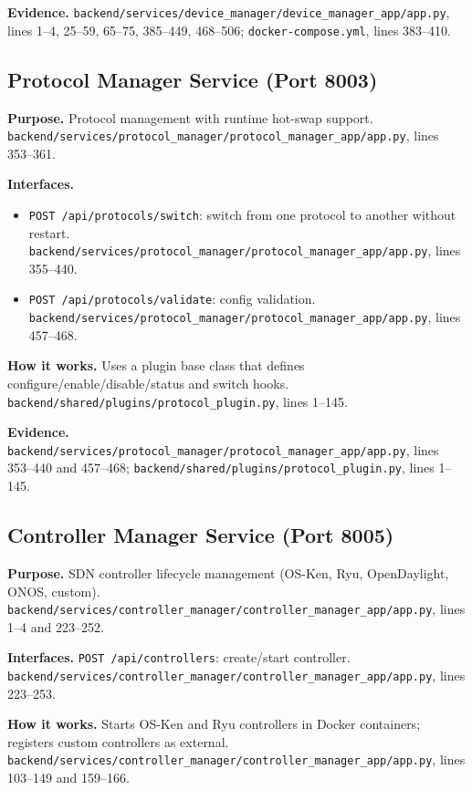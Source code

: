 \documentclass[10pt,a4paper]{article}
\begin{document}
\textbf{Evidence.} \texttt{backend/services/device\_manager/device\_manager\_app/app.py}, lines 1--4, 25--59, 65--75, 385--449, 468--506; \texttt{docker-compose.yml}, lines 383--410.

\subsection{Protocol Manager Service (Port 8003)}

\textbf{Purpose.} Protocol management with runtime hot-swap support. \texttt{backend/services/protocol\_manager/protocol\_manager\_app/app.py}, lines 353--361.

\textbf{Interfaces.}
\begin{itemize}[leftmargin=*]
\item \texttt{POST /api/protocols/switch}: switch from one protocol to another without restart. \texttt{backend/services/protocol\_manager/protocol\_manager\_app/app.py}, lines 355--440.
\item \texttt{POST /api/protocols/validate}: config validation. \texttt{backend/services/protocol\_manager/protocol\_manager\_app/app.py}, lines 457--468.
\end{itemize}

\textbf{How it works.} Uses a plugin base class that defines configure/enable/disable/status and switch hooks. \texttt{backend/shared/plugins/protocol\_plugin.py}, lines 1--145.

\textbf{Evidence.} \texttt{backend/services/protocol\_manager/protocol\_manager\_app/app.py}, lines 353--440 and 457--468; \texttt{backend/shared/plugins/protocol\_plugin.py}, lines 1--145.

\subsection{Controller Manager Service (Port 8005)}

\textbf{Purpose.} SDN controller lifecycle management (OS-Ken, Ryu, OpenDaylight, ONOS, custom). \texttt{backend/services/controller\_manager/controller\_manager\_app/app.py}, lines 1--4 and 223--252.

\textbf{Interfaces.} \texttt{POST /api/controllers}: create/start controller. \texttt{backend/services/controller\_manager/controller\_manager\_app/app.py}, lines 223--253.

\textbf{How it works.} Starts OS-Ken and Ryu controllers in Docker containers; registers custom controllers as external. \texttt{backend/services/controller\_manager/controller\_manager\_app/app.py}, lines 103--149 and 159--166.
\end{document}

